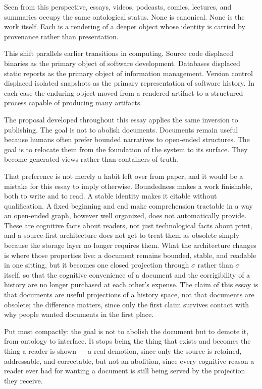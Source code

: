 \documentclass[11pt]{article}
\theoremstyle{definition}
\begin{document}
Seen from this perspective, essays, videos, podcasts, comics, lectures, and summaries occupy the same ontological status. None is canonical. None is the work itself. Each is a rendering of a deeper object whose identity is carried by provenance rather than presentation.

This shift parallels earlier transitions in computing. Source code displaced binaries as the primary object of software development. Databases displaced static reports as the primary object of information management. Version control displaced isolated snapshots as the primary representation of software history. In each case the enduring object moved from a rendered artifact to a structured process capable of producing many artifacts.

The proposal developed throughout this essay applies the same inversion to publishing. The goal is not to abolish documents. Documents remain useful because humans often prefer bounded narratives to open-ended structures. The goal is to relocate them from the foundation of the system to its surface. They become generated views rather than containers of truth.

That preference is not merely a habit left over from paper, and it would be a mistake for this essay to imply otherwise. Boundedness makes a work finishable, both to write and to read. A stable identity makes it citable without qualification. A fixed beginning and end make comprehension tractable in a way an open-ended graph, however well organized, does not automatically provide. These are cognitive facts about readers, not just technological facts about print, and a source-first architecture does not get to treat them as obsolete simply because the storage layer no longer requires them. What the architecture changes is where those properties live: a document remains bounded, stable, and readable in one sitting, but it becomes one closed projection through $\sigma$ rather than $\sigma$ itself, so that the cognitive convenience of a document and the corrigibility of a history are no longer purchased at each other's expense. The claim of this essay is that documents are useful projections of a history space, not that documents are obsolete; the difference matters, since only the first claim survives contact with why people wanted documents in the first place.

Put most compactly: the goal is not to abolish the document but to demote it, from ontology to interface. It stops being the thing that exists and becomes the thing a reader is shown --- a real demotion, since only the source is retained, addressable, and correctable, but not an abolition, since every cognitive reason a reader ever had for wanting a document is still being served by the projection they receive.
\end{document}
